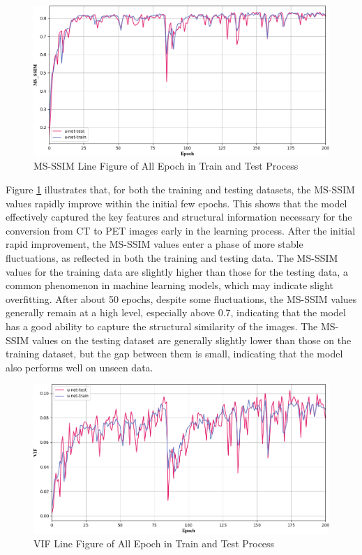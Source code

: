 \documentclass[twocolumn]{article}
\begin{document}
\begin{figure}[h]
	\centering
	\includegraphics[width=1.0\linewidth]{u-net/MS_SSIM}
	\caption[msssim]{MS-SSIM Line Figure of All Epoch in Train and Test Process}
	\label{fig:msssim}
\end{figure}

Figure \ref{fig:msssim} illustrates that, for both the training and testing datasets, the MS-SSIM values rapidly improve within the initial few epochs. This shows that the model effectively captured the key features and structural information necessary for the conversion from CT to PET images early in the learning process. After the initial rapid improvement, the MS-SSIM values enter a phase of more stable fluctuations, as reflected in both the training and testing data. The MS-SSIM values for the training data are slightly higher than those for the testing data, a common phenomenon in machine learning models, which may indicate slight overfitting. After about 50 epochs, despite some fluctuations, the MS-SSIM values generally remain at a high level, especially above 0.7, indicating that the model has a good ability to capture the structural similarity of the images. The MS-SSIM values on the testing dataset are generally slightly lower than those on the training dataset, but the gap between them is small, indicating that the model also performs well on unseen data.

\begin{figure}[h]
	\centering
	\includegraphics[width=1.0\linewidth]{u-net/VIF}
	\caption[vif]{VIF Line Figure of All Epoch in Train and Test Process}
	\label{fig:vif}
\end{figure}
\end{document}
